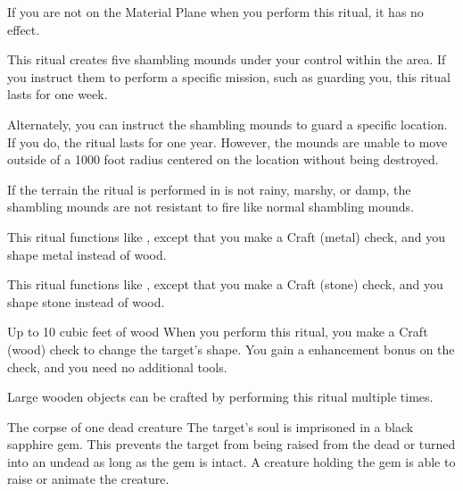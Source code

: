 If you are not on the Material Plane when you perform this ritual, it has no effect.

\spellline
\spelleffect This ritual creates five shambling mounds under your control within the area. If you instruct them to perform a specific mission, such as guarding you, this ritual lasts for one week.

Alternately, you can instruct the shambling mounds to guard a specific location. If you do, the ritual lasts for one year. However, the mounds are unable to move outside of a 1000 foot radius centered on the location without being destroyed.

\spellnotes If the terrain the ritual is performed in is not rainy, marshy, or damp, the shambling mounds are not resistant to fire like normal shambling mounds.

\spellspecial This ritual functions like , except that you make a Craft (metal) check, and you shape metal instead of wood. 

\spellspecial This ritual functions like , except that you make a Craft (stone) check, and you shape stone instead of wood.

\begin{spelltarget}{Up to 10 cubic feet of wood}
    \spelleffect When you perform this ritual, you make a Craft (wood) check to change the target's shape. You gain a  enhancement bonus on the check, and you need no additional tools.
\end{spelltarget}
\spellnotes Large wooden objects can be crafted by performing this ritual multiple times.

\spellrng{\rngclose}
\begin{spelltarget}{The corpse of one dead creature}
    \spelleffect The target's soul is imprisoned in a black sapphire gem. This prevents the target from being raised from the dead or turned into an undead as long as the gem is intact. A creature holding the gem is able to raise or animate the creature.
\end{spelltarget}

